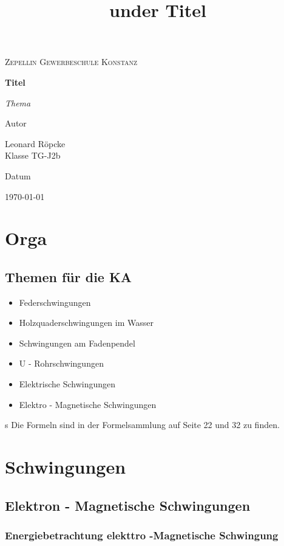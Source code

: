\documentclass{article}
\title{under Titel}
\newcommand{\AuthorName}{Leonard Röpcke\\Klasse TG-J2b}
\newcommand{\Institute}{Zepellin Gewerbeschule Konstanz}
\newcommand{\Subtitle}{Thema}
\newcommand{\MyDate}{\today}
\begin{document}
\begin{titlepage}
  \centering
  {\scshape\LARGE \Institute \par}
  \vspace{2.5cm}
  {\huge\bfseries Titel\par}
  \vspace{0.8cm}
  {\Large\itshape \Subtitle \par}
  \vfill
  {\Large Autor\par}
  {\Large \AuthorName \par}
  \vspace{1cm}
  {\Large Datum\par}
  {\Large \MyDate \par}
  \vfill
  \vspace{1cm}
  {\small }
\end{titlepage}
\tableofcontents
\newpage


\section{Orga}
\subsection{Themen für die KA}
\begin{itemize}
    \item Federschwingungen
    \item Holzquaderschwingungen im Wasser
    \item Schwingungen am Fadenpendel
    \item U - Rohrschwingungen
    \item Elektrische Schwingungen
    \item Elektro - Magnetische Schwingungen
\end{itemize}s
Die Formeln sind in der Formelsammlung auf Seite 22 und 32 zu finden.

\section{Schwingungen}
\subsection{Elektron - Magnetische Schwingungen}
\subsubsection{Energiebetrachtung elekttro -Magnetische Schwingung}
\end{document}
